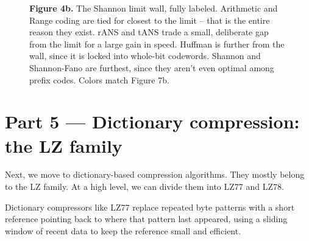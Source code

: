 \documentclass[11pt]{article}
\begin{document}
\begin{figure}[H]
\centering
{}
\caption*{\textbf{Figure 4b.} The Shannon limit wall, fully labeled. Arithmetic
and Range coding are tied for closest to the limit -- that is the entire
reason they exist. rANS and tANS trade a small, deliberate gap from the limit
for a large gain in speed. Huffman is further from the wall, since it is
locked into whole-bit codewords. Shannon and Shannon-Fano are furthest, since
they aren't even optimal among prefix codes. Colors match Figure 7b.}
\end{figure}

\section*{Part 5 --- Dictionary compression: the LZ family}

Next, we move to dictionary-based compression algorithms. They mostly
belong to the LZ family. At a high level, we can divide them into LZ77 and
LZ78.

Dictionary compressors like LZ77 replace repeated byte patterns with a short reference pointing back to where that pattern last appeared, 
using a sliding window of recent data to keep the reference small and efficient.
\end{document}
